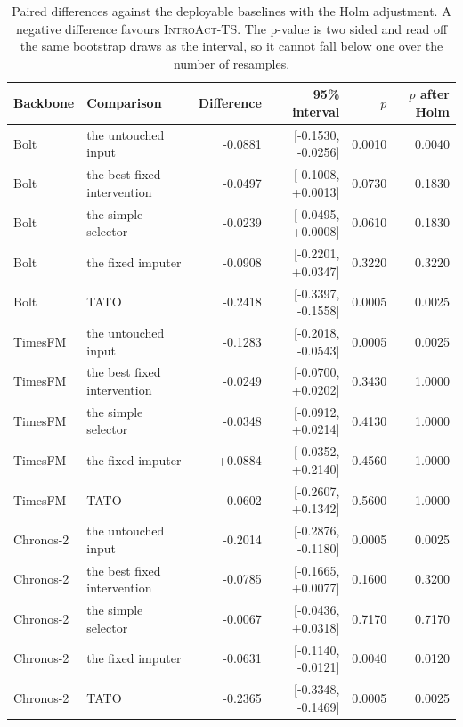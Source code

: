 \documentclass{article}
\newcommand{\introact}{\textsc{IntroAct-TS}}
\begin{document}
\begin{table}[htbp]
  \caption{Paired differences against the deployable baselines with the Holm adjustment.
  A negative difference favours \introact{}. The p-value is two sided and read off the same
  bootstrap draws as the interval, so it cannot fall below one over the number of resamples.}
  \label{tab:app-holm}
  \centering
  \small
  \setlength{\tabcolsep}{4pt}
\begin{tabular*}{\textwidth}{@{\extracolsep{\fill}}llrrrr@{}}
    \toprule
    Backbone & Comparison & Difference & 95\% interval & $p$ & $p$ after Holm \\
    \midrule
    Bolt & the untouched input & -0.0881 & [-0.1530, -0.0256] & 0.0010 & 0.0040 \\
    Bolt & the best fixed intervention & -0.0497 & [-0.1008, +0.0013] & 0.0730 & 0.1830 \\
    Bolt & the simple selector & -0.0239 & [-0.0495, +0.0008] & 0.0610 & 0.1830 \\
    Bolt & the fixed imputer & -0.0908 & [-0.2201, +0.0347] & 0.3220 & 0.3220 \\
    Bolt & TATO & -0.2418 & [-0.3397, -0.1558] & 0.0005 & 0.0025 \\
    TimesFM & the untouched input & -0.1283 & [-0.2018, -0.0543] & 0.0005 & 0.0025 \\
    TimesFM & the best fixed intervention & -0.0249 & [-0.0700, +0.0202] & 0.3430 & 1.0000 \\
    TimesFM & the simple selector & -0.0348 & [-0.0912, +0.0214] & 0.4130 & 1.0000 \\
    TimesFM & the fixed imputer & +0.0884 & [-0.0352, +0.2140] & 0.4560 & 1.0000 \\
    TimesFM & TATO & -0.0602 & [-0.2607, +0.1342] & 0.5600 & 1.0000 \\
    Chronos-2 & the untouched input & -0.2014 & [-0.2876, -0.1180] & 0.0005 & 0.0025 \\
    Chronos-2 & the best fixed intervention & -0.0785 & [-0.1665, +0.0077] & 0.1600 & 0.3200 \\
    Chronos-2 & the simple selector & -0.0067 & [-0.0436, +0.0318] & 0.7170 & 0.7170 \\
    Chronos-2 & the fixed imputer & -0.0631 & [-0.1140, -0.0121] & 0.0040 & 0.0120 \\
    Chronos-2 & TATO & -0.2365 & [-0.3348, -0.1469] & 0.0005 & 0.0025 \\
    \bottomrule
  \end{tabular*}
\end{table}
\end{document}
